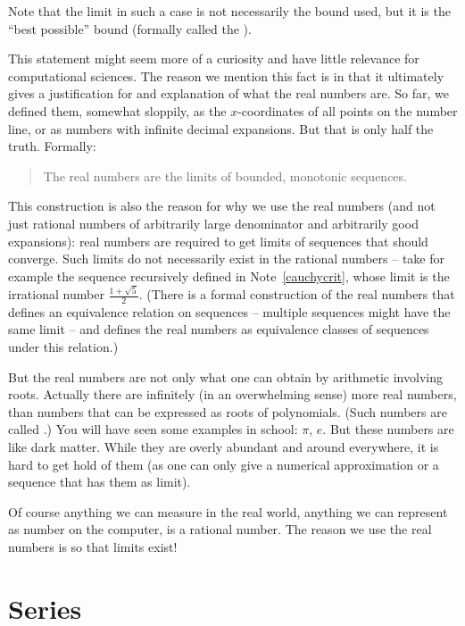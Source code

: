 Note that the limit in such a case is not necessarily the bound used, but it is the
``best possible'' bound (formally called the ).
\medskip

This statement might seem more of a curiosity and have little relevance for
computational sciences. The reason we mention this fact is in that it ultimately gives a
justification for and explanation of what the real numbers are. So far, we defined
them, somewhat sloppily, as the $x$-coordinates of all points on the number line, or as
numbers with infinite decimal expansions. But that is 
only half the truth. Formally:

\begin{quote}
The real numbers are the limits of bounded, monotonic sequences.
\end{quote}

This construction is also the reason for why we use the real numbers (and not
just rational numbers of arbitrarily large denominator and arbitrarily good
expansions): real numbers are required to get limits of sequences that should
converge. Such limits do not necessarily exist in the rational numbers --
take for example the sequence recursively defined in Note~\ref{cauchycrit},
whose limit is the irrational number $\frac{1+\sqrt{5}}{2}$.  (There is a
formal construction of the real numbers that defines an equivalence relation
on sequences -- multiple sequences might have the same limit -- and defines
the real numbers as equivalence classes of sequences under this relation.)

But the real numbers are not only what one can obtain by arithmetic involving
roots.  Actually there are infinitely (in an overwhelming sense) more real
numbers, than numbers that can be expressed as roots of polynomials. (Such
numbers are called .) You will have seen some examples
in school: $\pi$, $e$. But these numbers are like dark matter. While they are
overly abundant and around everywhere, it is hard to get hold of them (as one
can only give a numerical approximation or a sequence that has them as limit).
\smallskip

Of course anything we can measure in the real world, anything we can represent as number
on the computer, is a rational number. The reason we use the real numbers is so that
limits exist!

\section{Series}

